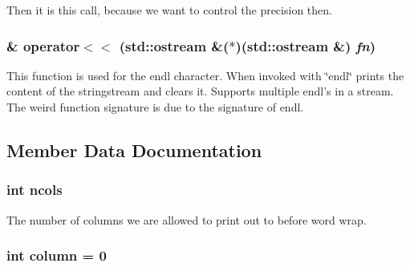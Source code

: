 Then it is this call, because we want to control the precision then. \hypertarget{classJKBuilder_1_1IOManager_a4ab394f377d37c6598659317320ec38c}{
\subsubsection[{operator$<$$<$}]{ \& operator$<$$<$ (std::ostream \&($\ast$)(std::ostream \&) {\em fn})}}
\label{classJKBuilder_1_1IOManager_a4ab394f377d37c6598659317320ec38c}


This function is used for the endl character. When invoked with \char`\"{}endl\char`\"{} prints the content of the stringstream and clears it. Supports multiple endl's in a stream. The weird function signature is due to the signature of endl. 

\subsection{Member Data Documentation}
\hypertarget{classJKBuilder_1_1printer_a7c4b990ebe8d2c098f3974f6ffe0c9b4}{
\subsubsection[{ncols}]{\setlength{\rightskip}{0pt plus 5cm}int {\bf ncols}}}
\label{classJKBuilder_1_1printer_a7c4b990ebe8d2c098f3974f6ffe0c9b4}


The number of columns we are allowed to print out to before word wrap. \hypertarget{classJKBuilder_1_1printer_a60dae4c6e78188cd718b696e4f08fc71}{
\subsubsection[{column}]{\setlength{\rightskip}{0pt plus 5cm}int {\bf column} = 0}}
\label{classJKBuilder_1_1printer_a60dae4c6e78188cd718b696e4f08fc71}


